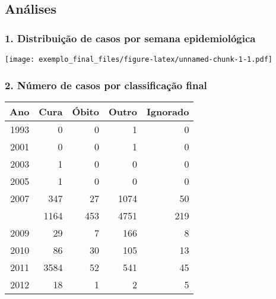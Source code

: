 \documentclass[
]{article}
\begin{document}
\newpage

\subsection{Análises}\label{anuxe1lises}

\subsubsection{1. Distribuição de casos por semana
epidemiológica}\label{distribuiuxe7uxe3o-de-casos-por-semana-epidemioluxf3gica}

\texttt{[image: exemplo\_final\_files/figure-latex/unnamed-chunk-1-1.pdf]}

\newpage

\subsubsection{2. Número de casos por classificação
final}\label{nuxfamero-de-casos-por-classificauxe7uxe3o-final}

\begin{longtable}[t]{rrrrr}
\toprule
Ano & Cura & Óbito & Outro & Ignorado\\
\midrule
1993 & 0 & 0 & 1 & 0\\
2001 & 0 & 0 & 1 & 0\\
2003 & 1 & 0 & 0 & 0\\
2005 & 1 & 0 & 0 & 0\\
2007 & 347 & 27 & 1074 & 50\\
\addlinespace
2008 & 1164 & 453 & 4751 & 219\\
2009 & 29 & 7 & 166 & 8\\
2010 & 86 & 30 & 105 & 13\\
2011 & 3584 & 52 & 541 & 45\\
2012 & 18 & 1 & 2 & 5\\
\bottomrule
\end{longtable}
\end{document}

